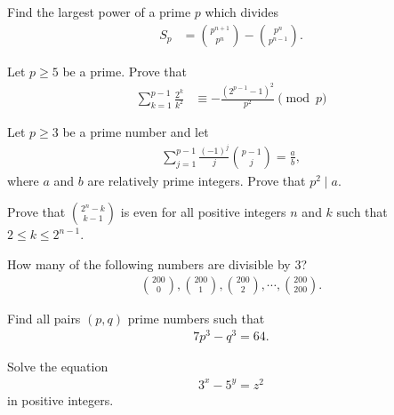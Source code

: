 \documentclass{subfile}
\begin{document}
	\begin{problem} %
		Find the largest power of a prime $p$ which divides
		\begin{align*}
			S_p
				& =\binom{p^{n+1}}{p^n}-\binom{p^{n}}{p^{n-1}}.
		\end{align*}
	\end{problem}

	\begin{problem} %
		Let $p \geq 5$ be a prime. Prove that
			\begin{align*}
				\sum_{k=1}^{p-1}\frac{2^k}{k^2}
					& \equiv-\frac{(2^{p-1}-1)^2}{p^2}\pmod p
			\end{align*}
	\end{problem}

	\begin{problem} %
		Let $p\geq 3$ be a prime number and let
			\begin{align*}
				\sum_{j=1}^{p-1}\frac{(-1)^{j}}{j} \binom{p-1}{j} =\frac{a}{b},
			\end{align*}
		where $a$ and $b$ are relatively prime integers. Prove that $p^2\mid a$.
	\end{problem}

	\begin{problem} %
		Prove that $\binom{2^{n}-k}{k-1}$ is even for all positive integers $n$ and $k$ such that $2\le k\le 2^{n-1}$.
	\end{problem}

	\begin{problem} %
		How many of the following numbers are divisible by $3$?
		\begin{align*}
		\binom{200}{0}, \binom{200}{1}, \binom{200}{2}, \cdots, \binom{200}{200}.
		\end{align*}
	\end{problem}


	\begin{problem} %
		Find all pairs $(p,q)$ prime numbers such that
			\begin{align*}
				7 p^3 - q^3 = 64.
			\end{align*}
	\end{problem}

	\begin{problem}[BMO 2009] %
		Solve the equation
			\begin{align*}
				3^x - 5^y = z^2
			\end{align*}
		in positive integers.
	\end{problem}
\end{document}
